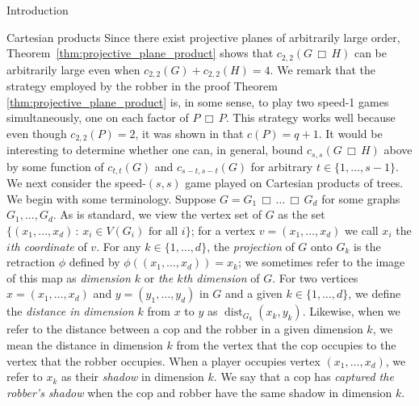 \documentclass[12pt]{amsart}
\newcommand{\comment}[1]{\textcolor{red}{#1}}
\theoremstyle{definition}
\DeclareMathOperator{\dist}{dist}
\def\cart{\, \Box \,}
\newcommand{\speed}[1]{c_{#1,#1}}
\begin{document}
\begin{section}{Introduction}
\begin{section}{Cartesian products}
Since there exist projective planes of arbitrarily large order, Theorem~\ref{thm:projective_plane_product} shows that $\speed{2}(G \cart H)$ can be arbitrarily large even when $\speed{2}(G)+\speed{2}(H) = 4$.  We remark that the strategy employed by the robber in the proof Theorem \ref{thm:projective_plane_product} is, in some sense, to play two speed-1 games simultaneously, one on each factor of $P \cart P$.  This strategy works well because even though $\speed{2}(P) = 2$, it was shown in \cite{Pra10} that $c(P) = q+1$.  It would be interesting to determine whether one can, in general, bound $\speed{s}(G \cart H)$ above by some function of $\speed{t}(G)$ and $\speed{s-t}(G)$ for arbitrary $t \in \{1, \dots, s-1\}$.\\

 We next consider the speed-$(s,s)$ game played on Cartesian products of trees.  We begin with some terminology.  Suppose $G = G_1 \cart \dots \cart G_d$ for some graphs $G_1, \dots, G_d$.  As is standard, we view the vertex set of $G$ as the set $\{(x_1, \dots, x_d) \, : \, x_i \in V(G_i) \text{ for all } i\}$; for a vertex $v = (x_1, \dots, x_d)$ we call $x_i$ the \textit{$i$th coordinate} of $v$.  For any $k \in \{1, \dots, d\}$, the \textit{projection} of $G$ onto $G_k$ is the retraction $\phi$ defined by $\phi((x_1, \dots, x_d)) = x_k$; we sometimes refer to the image of this map as \textit{dimension $k$} or \textit{the $k$th dimension} of $G$.  For two vertices $x=(x_1,\dots,x_d)$ and $y=(y_1,\dots,y_d)$ in $G$ and a given $k\in\{1,\dots,d\}$, we define the \textit{distance in dimension $k$} from $x$ to $y$ as $\dist_{G_k}(x_k, y_k)$.  Likewise, when we refer to the distance between a cop and the robber in a given dimension $k$, we mean the distance in dimension $k$ from the vertex that the cop occupies to the vertex that the robber occupies.  When a player occupies vertex $(x_1, \dots, x_d)$, we refer to $x_k$ as their \textit{shadow} in dimension $k$. We say that a cop has \textit{captured the robber's shadow} when the cop and robber have the same shadow in dimension $k$.

 


\end{section}
\end{section}
\end{document}

